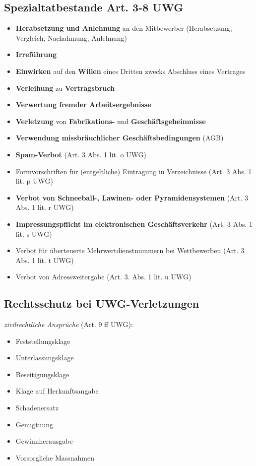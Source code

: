 \documentclass{report}
\theoremstyle{definition}
\theoremstyle{example}
\begin{document}
\subsection{Spezialtatbestande Art. 3-8 UWG}
\begin{itemize}
   \item \textbf{Herabsetzung und Anlehnung} an den Mitbewerber (Herabsetzung, Vergleich, Nachahmung, Anlehnung)
   \item \textbf{Irreführung}
   \item \textbf{Einwirken} auf den \textbf{Willen} eines Dritten zwecks Abschluss eines Vertrages
   \item \textbf{Verleihung} zu \textbf{Vertragsbruch}
   \item \textbf{Verwertung fremder Arbeitsergebnisse}
   \item \textbf{Verletzung} von \textbf{Fabrikations-} und \textbf{Geschäftsgeheimnisse}
   \item \textbf{Verwendung missbräuchlicher Geschäftsbedingungen} (AGB)
   \item \textbf{Spam-Verbot} (Art. 3 Abs. 1 lit. o UWG)
   \item Formvorschriften für (entgeltliche) Eintragung in Verzeichnisse (Art. 3 Abs. 1 lit. p UWG)
   \item \textbf{Verbot von Schneeball-, Lawinen- oder Pyramidensystemen} (Art. 3 Abs. 1 lit. r UWG)
   \item \textbf{Impressungspflicht im elektronischen Geschäftsverkehr} (Art. 3 Abs. 1 lit. s UWG)
   \item Verbot für überteuerte Mehrwertdienstnummern bei Wettbewerben (Art. 3 Abs. 1 lit. t UWG)
   \item Verbot von Adressweitergabe (Art. 3. Abs. 1 lit. u UWG)
\end{itemize}

\subsection{Rechtsschutz bei UWG-Verletzungen}
\textit{zivilrechtliche Ansprüche} (Art. 9 ff UWG):
\begin{itemize}
   \item Feststellungsklage
   \item Unterlassungsklage
   \item Beseitigungsklage
   \item Klage auf Herkunftsangabe
   \item Schadenersatz
   \item Genugtuung
   \item Gewinnherausgabe
   \item Vorsorgliche Massnahmen
\end{itemize}
\end{document}
